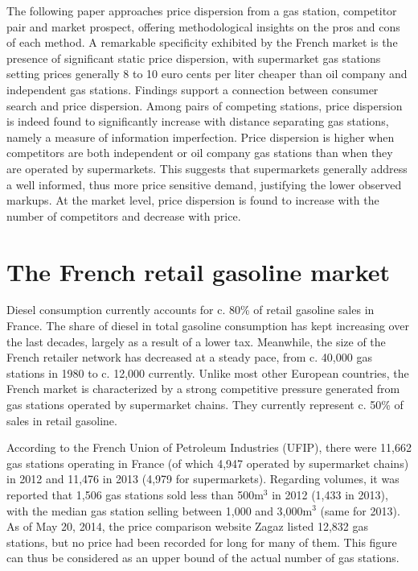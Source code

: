 \documentclass[english]{article}
\begin{document}
The following paper approaches price dispersion from a gas station, competitor pair and market prospect, offering methodological insights on the pros and cons of each method. A remarkable specificity exhibited by the French market is the presence of significant static price dispersion, with supermarket gas stations setting prices generally 8 to 10 euro cents per liter cheaper than oil company and independent gas stations. Findings support a connection between consumer search and price dispersion. Among pairs of competing stations, price dispersion is indeed found to significantly increase with distance separating gas stations, namely a measure of information imperfection. Price dispersion is higher when competitors are both independent or oil company gas stations than when they are operated by supermarkets. This suggests that supermarkets generally address a well informed, thus more price sensitive demand, justifying the lower observed markups. At the market level, price dispersion is found to increase with the number of competitors and decrease with price.

\section{The French retail gasoline market}

Diesel consumption currently accounts for c. 80\% of retail gasoline sales in France. The share of diesel in total gasoline consumption has kept increasing over the last decades, largely as a result of a lower tax. Meanwhile, the size of the French retailer network has decreased at a steady pace, from c. 40,000 gas stations in 1980 to c. 12,000 currently.  Unlike most other European countries, the French market is characterized by a strong competitive pressure generated from gas stations operated by supermarket chains. They currently represent c. 50\% of sales in retail gasoline.

According to the French Union of Petroleum Industries (UFIP), there were 11,662 gas stations operating in France (of which 4,947 operated by supermarket chains) in 2012 and 11,476 in 2013 (4,979 for supermarkets). Regarding volumes, it was reported that 1,506 gas stations sold less than 500m$^{3}$ in 2012 (1,433 in 2013), with the median gas station selling between 1,000 and 3,000m$^{3}$ (same for 2013). As of May 20, 2014, the price comparison website Zagaz listed 12,832 gas stations, but no price had been recorded for long for many of them. This figure can thus be considered as an upper bound of the actual number of gas stations.
\end{document}

